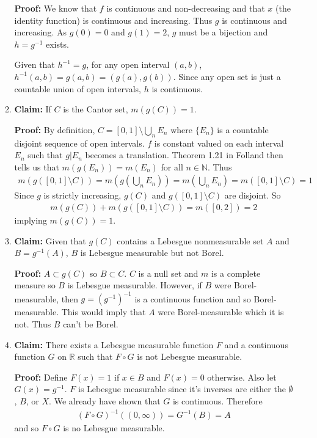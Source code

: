 \documentclass[11pt,letter]{article}
\begin{document}
\begin{enumerate}
\begin{enumerate}
        \textbf{Proof:}
        We know that $f$ is continuous and non-decreasing and that $x$ (the identity function) is continuous and increasing. Thus $g$ is continuous and increasing. As $g(0) = 0$ and $g(1) = 2$, $g$ must be a bijection and $h = g^{-1}$ exists.

        Given that $h^{-1} = g$, for any open interval $(a,b)$, $h^{-1}(a,b) = g(a,b) = (g(a),g(b))$. Since any open set is just a countable union of open intervals, $h$ is continuous.

        \item \textbf{Claim:} If $C$ is the Cantor set, $m(g(C)) = 1$.

        \textbf{Proof:} By definition, $C = [0,1] \setminus \bigcup_n E_n$ where $\{E_n\}$ is a countable disjoint sequence of open intervals. $f$ is constant valued on each interval $E_n$ such that $g|E_n$ becomes a translation. Theorem 1.21 in Folland then tells us that $m(g(E_n)) = m(E_n)$ for all $n \in \mathbb{N}$. Thus
        \begin{align*}
            m(g([0,1] \setminus C)) = m(g(\bigcup_n E_n)) = m(\bigcup_n E_n) = m([0,1] \setminus C) = 1
        \end{align*} 
        Since $g$ is strictly increasing, $g(C)$ and $g([0,1]\setminus C)$ are disjoint. So
        \begin{align*}
            m(g(C)) + m(g([0,1]\setminus C)) = m([0,2]) = 2 
        \end{align*}
        implying $m(g(C)) = 1$.

        \item \textbf{Claim:} Given that $g(C)$ contains a Lebesgue nonmeasurable set $A$ and $B = g^{-1}(A)$, $B$ is Lebesgue measurable but not Borel.

        \textbf{Proof:} $A \subset g(C)$ so $B \subset C$. $C$ is a null set and $m$ is a complete measure so $B$ is Lebesgue measurable.
        However, if $B$ were Borel-measurable, then $g = (g^{-1})^{-1}$ is a continuous function and so Borel-measurable. This would imply that $A$ were Borel-measurable which it is not. Thus $B$ can't be Borel.

        \item \textbf{Claim:} There exists a Lebesgue measurable function $F$ and a continuous function $G$ on $\mathbb{R}$ such that $F \circ G$ is not Lebesgue measurable.

        \textbf{Proof:} Define $F(x) = 1$ if $x \in B$ and $F(x) = 0$ otherwise. Also let $G(x) = g^{-1}$. $F$ is Lebesgue measurable since it's inverses are either the $\emptyset$, $B$, or $X$. We already have shown that $G$ is continuous. Therefore
        \begin{align*}
            (F \circ G)^{-1}((0,\infty)) = G^{-1}(B) = A
        \end{align*}
        and so $F \circ G$ is no Lebesgue measurable.
    \end{enumerate}
\end{enumerate}
\end{document}
